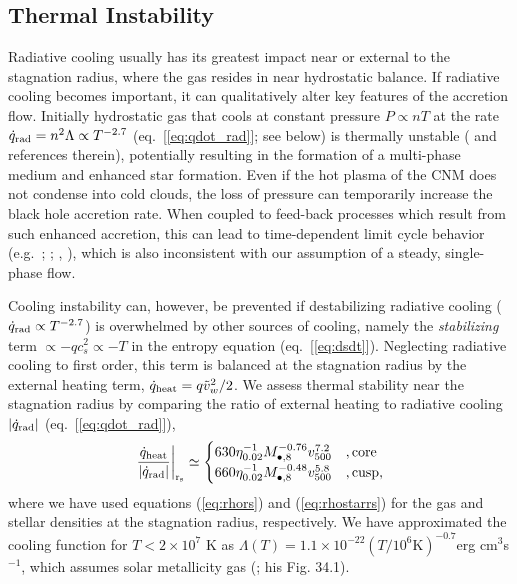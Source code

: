 \documentclass[usenatbib,fleqn]{mn2e}
\begin{document}
\subsection{Thermal Instability}
\label{sec:instability}

Radiative cooling usually has its greatest impact near or external to
the stagnation radius, where the gas resides in near hydrostatic
balance.  If radiative cooling becomes important, it can qualitatively
alter key features of the accretion flow. Initially hydrostatic gas
that cools at constant pressure $P \propto nT$ at the rate
$\dot{q}_{\rm rad} = n^{2}\Lambda \propto T^{-2.7}$
(eq.~[\ref{eq:qdot_rad}]; see below) is thermally unstable
(\citealt{McCourt+12} and references therein), potentially resulting
in the formation of a multi-phase medium and enhanced star formation.
Even if the hot plasma of the CNM does not condense into cold clouds,
the loss of pressure can temporarily increase the black hole accretion
rate.  When coupled to feed-back processes which result from such enhanced accretion, this can lead to
time-dependent limit cycle behavior
(e.g.~\citealt{Ciotti&Ostriker07}; \citealt{Ciotti+10};
\citealt{Yuan&Li11}, \citealt{Gan+14}), which is also inconsistent
with our assumption of a steady, single-phase flow.

Cooling instability can, however, be prevented if destabilizing radiative cooling ($\dot{q}_{\rm rad} \propto T^{-2.7}$) is overwhelmed by
other sources of cooling, namely the {\it stabilizing} term $\propto -q c_{s}^{2}
\propto -T$ in the entropy equation (eq.~[\ref{eq:dsdt}]).
Neglecting radiative cooling to first order, this term is balanced at the stagnation
radius by the external heating term, $\dot{q}_{\rm heat} = q
\tilde{v}_{w}^{2}/2$.  We assess thermal stability near the stagnation radius by comparing the ratio of external heating to
radiative cooling $|\dot{q}_{\rm rad}|$ (eq.~[\ref{eq:qdot_rad}]),
\begin{align}
\left.\frac{\dot{q}_{\rm heat}}{|\dot{q}_{\rm rad}|}\right|_{\rm r_{\rm s}} \simeq
  \begin{cases}
   630 \eta_{0.02}^{-1} M_{\bullet,8}^{-0.76}v_{500}^{7.2}  &, \text{core}\\
   660 \eta_{0.02}^{-1} M_{\bullet,8}^{-0.48}v_{500}^{5.8}  &, \text{cusp},     
  \end{cases}
  \label{eq:cooling2}
\end{align}
where we have used equations (\ref{eq:rhors}) and (\ref{eq:rhostarrs})
for the gas and stellar densities at the stagnation radius,
respectively.  We have approximated the cooling function for $T <
2\times 10^{7}$ K as $\Lambda(T) = 1.1 \times 10^{-22} \left(T/10^6
  \text{K}\right)^{-0.7} $erg cm$^3 $s$^{-1}$, which assumes solar
metallicity gas (\citealt{Draine:2011a}; his Fig. 34.1).
\end{document}
